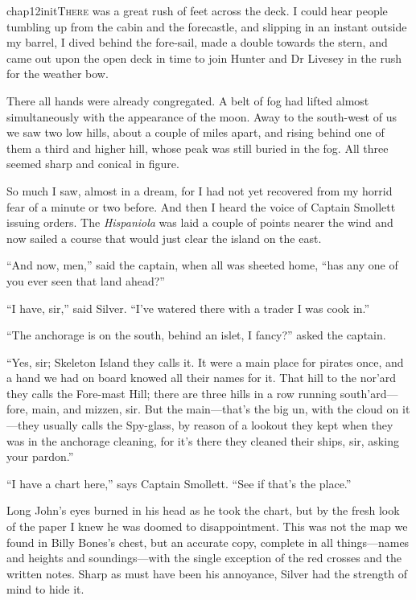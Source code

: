 
   \lettrine[lines=4,image=true]{chap12initT}{here} was a great rush of feet across the deck. I could hear people tumbling up from the cabin and the forecastle, and slipping in an instant outside my barrel, I dived behind the fore-sail, made a double towards the stern, and came out upon the open deck in time to join Hunter and Dr Livesey in the rush for the weather bow.

There all hands were already congregated. A belt of fog had lifted almost simultaneously with the appearance of the moon. Away to the south-west of us we saw two low hills, about a couple of miles apart, and rising behind one of them a third and higher hill, whose peak was still buried in the fog. All three seemed sharp and conical in figure.

So much I saw, almost in a dream, for I had not yet recovered from my horrid fear of a minute or two before. And then I heard the voice of Captain Smollett issuing orders. The \textit{Hispaniola} was laid a couple of points nearer the wind and now sailed a course that would just clear the island on the east.

\enquote{And now, men,} said the captain, when all was sheeted home, \enquote{has any one of you ever seen that land ahead?}

\enquote{I have, sir,} said Silver. \enquote{I’ve watered there with a trader I was cook in.}

\enquote{The anchorage is on the south, behind an islet, I fancy?} asked the captain.

\enquote{Yes, sir; Skeleton Island they calls it. It were a main place for pirates once, and a hand we had on board knowed all their names for it. That hill to the nor’ard they calls the Fore-mast Hill; there are three hills in a row running south’ard---fore, main, and mizzen, sir. But the main---that’s the big un, with the cloud on it---they usually calls the Spy-glass, by reason of a lookout they kept when they was in the anchorage cleaning, for it’s there they cleaned their ships, sir, asking your pardon.}

\enquote{I have a chart here,} says Captain Smollett. \enquote{See if that’s the place.}

Long John’s eyes burned in his head as he took the chart, but by the fresh look of the paper I knew he was doomed to disappointment. This was not the map we found in Billy Bones’s chest, but an accurate copy, complete in all things---names and heights and soundings---with the single exception of the red crosses and the written notes. Sharp as must have been his annoyance, Silver had the strength of mind to hide it.

